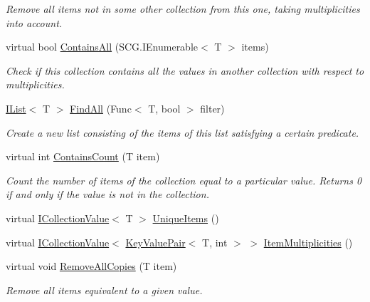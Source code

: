 \begin{DoxyCompactItemize}
\begin{DoxyCompactList}\small\item\em Remove all items not in some other collection from this one, taking multiplicities into account. \end{DoxyCompactList}\item 
virtual bool \hyperlink{class_c5_1_1_linked_list_a10a876c3bb88997efbca9d7ab6cc9ed4}{Contains\+All} (S\+C\+G.\+I\+Enumerable$<$ T $>$ items)
\begin{DoxyCompactList}\small\item\em Check if this collection contains all the values in another collection with respect to multiplicities. \end{DoxyCompactList}\item 
\hyperlink{interface_c5_1_1_i_list}{I\+List}$<$ T $>$ \hyperlink{class_c5_1_1_linked_list_a40efdf9ab3f9c34b6cdb1a408d2c97ac}{Find\+All} (Func$<$ T, bool $>$ filter)
\begin{DoxyCompactList}\small\item\em Create a new list consisting of the items of this list satisfying a certain predicate. \end{DoxyCompactList}\item 
virtual int \hyperlink{class_c5_1_1_linked_list_a7ea7467fd1107ed2d38e29966f188266}{Contains\+Count} (T item)
\begin{DoxyCompactList}\small\item\em Count the number of items of the collection equal to a particular value. Returns 0 if and only if the value is not in the collection. \end{DoxyCompactList}\item 
virtual \hyperlink{interface_c5_1_1_i_collection_value}{I\+Collection\+Value}$<$ T $>$ \hyperlink{class_c5_1_1_linked_list_ae1fa3b103e84b621d2746bdf73e5dec5}{Unique\+Items} ()
\item 
virtual \hyperlink{interface_c5_1_1_i_collection_value}{I\+Collection\+Value}$<$ \hyperlink{struct_c5_1_1_key_value_pair}{Key\+Value\+Pair}$<$ T, int $>$ $>$ \hyperlink{class_c5_1_1_linked_list_a385ed37a08dddfbef49633940710adf0}{Item\+Multiplicities} ()
\item 
virtual void \hyperlink{class_c5_1_1_linked_list_a307f85230fbf4f94a444743220080030}{Remove\+All\+Copies} (T item)
\begin{DoxyCompactList}\small\item\em Remove all items equivalent to a given value. \end{DoxyCompactList}\item 

\end{DoxyCompactItemize}
